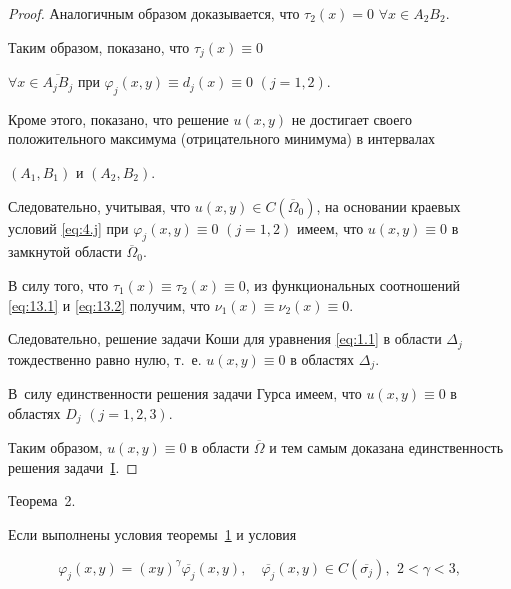 \begin{proof}
Аналогичным  образом доказывается, что ${\tau _2}(x) = 0$ $\forall x \in {A_2}{B_2}$.



Таким образом, показано, что  ${\tau _j}(x) \equiv 0$ 

$\forall x \in \overline {{A_j}{B_j}} $ при ${\varphi _j}(x,y) \equiv {d_j}(x) \equiv 0$ $(j= 1, 2)$.

Кроме этого, показано, что решение $u(x, y)$ не достигает своего положительного максимума (отрицательного минимума) в интервалах

$(A_1, B_1)$ и $(A_2,B_2).$

Следовательно, учитывая, что $u(x,y) \in C\left( {{{\overline \Omega  }_0}} \right)$, на основании краевых условий  \eqref{eq:4.j}  при  ${\varphi _j}(x,y) \equiv 0$ $(j = 1, 2)$ имеем, что $u(x,y) \equiv 0$ в замкнутой области ${\overline \Omega  _0}$.



В силу того, что ${\tau _1}(x) \equiv {\tau _2}(x) \equiv 0$, из функциональных соотношений \eqref{eq:13.1} и \eqref{eq:13.2} получим, что ${\nu _1}(x) \equiv {\nu _2}(x) \equiv 0$. 

Следовательно, решение задачи Коши для уравнения \eqref{eq:1.1} в области ${\Delta _j}$ тождественно равно нулю, т.~е. $u(x,y)

\equiv 0$ в областях ${\Delta _j}$. 

В~силу единственности решения задачи Гурса имеем, что $u(x,y) \equiv 0$ в областях ${D_j}$ $(j = 1, 2, 3)$. 

Таким образом, $u(x,y) \equiv 0$ в области $\overline \Omega  $ и тем самым доказана единственность решения задачи~\hyperlink{abd:taskI}{\rm I}.

\end{proof}



\smallskip






\hypertarget{abd:th2}{}



{\small\sc Теорема~2.} \it 

Если выполнены условия теоремы~\hyperlink{abd:th1}{\rm 1} и условия

\begin{equation}

{\varphi _j}(x,y) = {(xy)^\gamma }\overline {{\varphi _j}} (x,y), \quad \overline {{\varphi _j}} (x,y) \in C\left( {\overline {{\sigma _j}} } \right),\,\ 2

< \gamma  < 3, \label{eq:19.j}

\end{equation}


